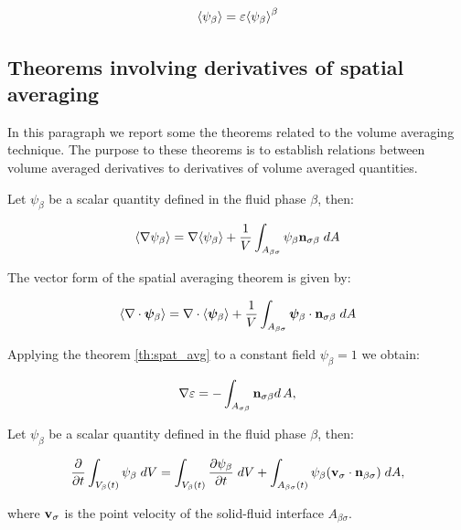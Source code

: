 \begin{equation}
	{\left< \psi_{\beta} \right>} =  \varepsilon {\left< \psi_{\beta} \right>}^{\beta}
	\label{eq:means_vs_meani}
\end{equation}

\subsection{Theorems involving derivatives of spatial averaging}

In this paragraph we report some the theorems related to the volume averaging technique. The purpose to these theorems is to establish relations between volume averaged derivatives to derivatives of volume averaged quantities.

\begin{theorem}
Let $\psi_{\beta}$ be a scalar quantity defined in the fluid phase $\beta$, then:

	\begin{equation}
		{\left< \nabla \psi_{\beta} \right>} = \nabla {\left< \psi_{\beta} \right>} + \dfrac{1}{V} \int_{A_{\beta \sigma}} \psi_{\beta} \mathbf{n}_{\sigma \beta}   \;dA
			\label{th:spat_avg}
	\end{equation}
\end{theorem}

\begin{corollary}
	The vector form of the spatial averaging theorem is given by:
	
	\begin{equation}
	{\left< \nabla \cdot \boldsymbol{\psi}_{\beta} \right>} = \nabla \cdot {\left<  \boldsymbol{\psi}_{\beta} \right>} + \dfrac{1}{V} \int_{A_{\beta \sigma}}  \boldsymbol{\psi}_{\beta} \cdot \mathbf{n}_{\sigma \beta} \;dA
			\label{th:vec_spat_avg}
	\end{equation}
\end{corollary}

\begin{corollary}
	Applying the theorem \ref{th:spat_avg} to a constant field $\psi_{\beta} = 1$ we obtain:
	
	\begin{equation}
		\nabla \varepsilon = - \int_{A_{\sigma \beta}} \mathbf{n}_{\sigma \beta} d \, A,
	\end{equation}
\end{corollary}


\begin{theorem}
	Let $\psi_{\beta}$ be a scalar quantity defined in the fluid phase $\beta$, then:
	
	\begin{equation}
	\dfrac{\partial}{\partial t} \int_{V_\beta(t)} \psi_{\beta} \; dV =  \int_{V_\beta(t)} \dfrac{\partial \psi_{\beta}}{\partial t} \; dV + \int_{A_{\beta \sigma}(t)} \psi_{\beta} (\textbf{v}_{\sigma} \cdot \mathbf{n}_{\beta \sigma} ) \;dA,
	\label{th:transport}
	\end{equation}
	
	where $\textbf{v}_{\sigma}$ is the point velocity of the solid-fluid interface $A_{\beta \sigma}$.
\end{theorem}


